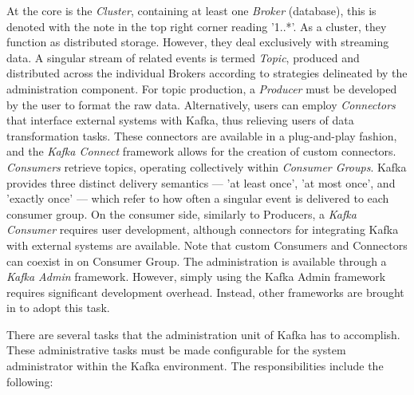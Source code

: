 At the core is the \textit{Cluster}, containing at least one \textit{Broker} (database), this is denoted with the note in the top right corner reading '1..*'. As a cluster, they function as distributed storage. However, they deal exclusively with streaming data. A singular stream of related events is termed \textit{Topic}, produced and distributed across the individual Brokers according to strategies delineated by the administration component. For topic production, a \textit{Producer} must be developed by the user to format the raw data. Alternatively, users can employ \textit{Connectors} that interface external systems with Kafka, thus relieving users of data transformation tasks. These connectors are available in a plug-and-play fashion, and the \textit{Kafka Connect} framework allows for the creation of custom connectors. \textit{Consumers} retrieve topics, operating collectively within \textit{Consumer Groups}. Kafka provides three distinct delivery semantics — 'at least once', 'at most once', and 'exactly once' — which refer to how often a singular event is delivered to each consumer group. On the consumer side, similarly to Producers, a \textit{Kafka Consumer} requires user development, although connectors for integrating Kafka with external systems are available. Note that custom Consumers and Connectors can coexist in on Consumer Group. The administration is available through a \textit{Kafka Admin} framework. However, simply using the Kafka Admin framework requires significant development overhead. Instead, other frameworks are brought in to adopt this task. \par 

There are several tasks that the administration unit of Kafka has to accomplish. These administrative tasks must be made configurable for the system administrator within the Kafka environment. The responsibilities include the following: 


